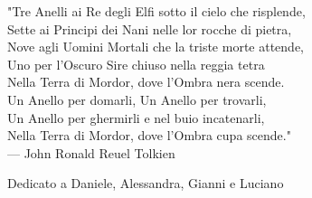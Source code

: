 
\cleardoublepage
{}
\thispagestyle{empty}

\vspace*{3cm}

\begin{center}
"Tre Anelli ai Re degli Elfi sotto il cielo che risplende,\\
Sette ai Principi dei Nani nelle lor rocche di pietra,\\
Nove agli Uomini Mortali che la triste morte attende,\\
Uno per l'Oscuro Sire chiuso nella reggia tetra\\
Nella Terra di Mordor, dove l'Ombra nera scende.\\
Un Anello per domarli, Un Anello per trovarli,\\
Un Anello per ghermirli e nel buio incatenarli,\\
Nella Terra di Mordor, dove l'Ombra cupa scende." \\ \medskip
--- John Ronald Reuel Tolkien    
\end{center}

\medskip

\begin{center}
Dedicato a Daniele, Alessandra, Gianni e Luciano
\end{center}
